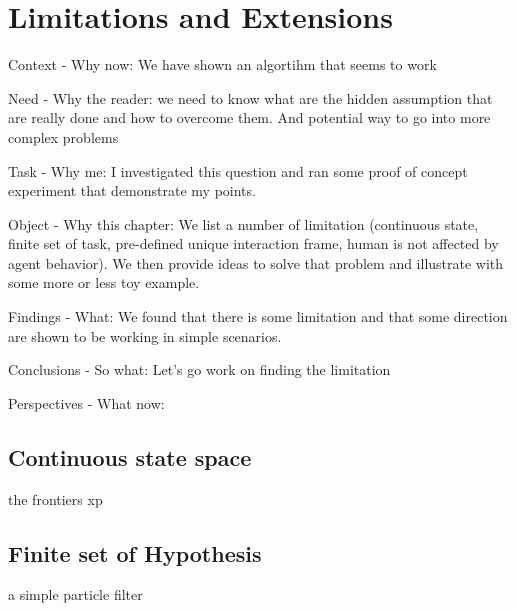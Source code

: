 \renewcommand{\chapterpath}{\allchapterspath/limitations}
\renewcommand{\imgpath}{\chapterpath/img}

\chapter{Limitations and Extensions}
\label{chapter:limitations}
\minitoc

Context - Why now: We have shown an algortihm that seems to work

Need - Why the reader: we need to know what are the hidden assumption that are really done and how to overcome them. And potential way to go into more complex problems

Task - Why me: I investigated this question and ran some proof of concept experiment that demonstrate my points.

Object - Why this chapter: We list a number of limitation (continuous state, finite set of task, pre-defined unique interaction frame, human is not affected by agent behavior). We then provide ideas to solve that problem and illustrate with some more or less toy example.

Findings - What: We found that there is some limitation and that some direction are shown to be working in simple scenarios.

Conclusions - So what: Let's go work on finding the limitation

Perspectives - What now: 

\section{Continuous state space}
the frontiers xp

\section{Finite set of Hypothesis}
a simple particle filter

